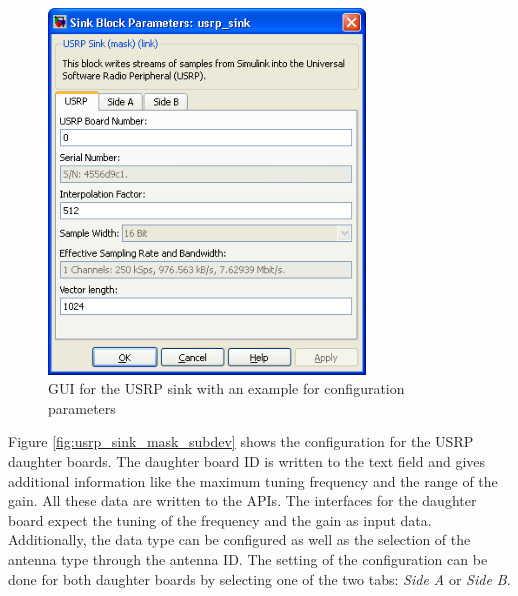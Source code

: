 \begin{figure}
	\centering
		\includegraphics[width=0.75\textwidth]{../kapitel03/figures/usrp_sink_mask_usrp.png}
	\caption{GUI for the USRP sink with an example for configuration parameters}
	\label{fig:usrp_sink_mask_usrp}
\end{figure}

Figure \ref{fig:usrp_sink_mask_subdev} shows the configuration for the USRP daughter boards. The daughter board ID is  written to the text field and gives additional information like the maximum tuning frequency and the range of the gain. All these data are written to the APIs. The interfaces for the daughter board expect the tuning of the frequency and the gain as input data. Additionally, the data type can be configured as well as the selection of the antenna type through the antenna ID. The setting of the configuration can be done for both daughter boards by selecting one of the two tabs: \emph{Side A} or \emph{Side B}.


